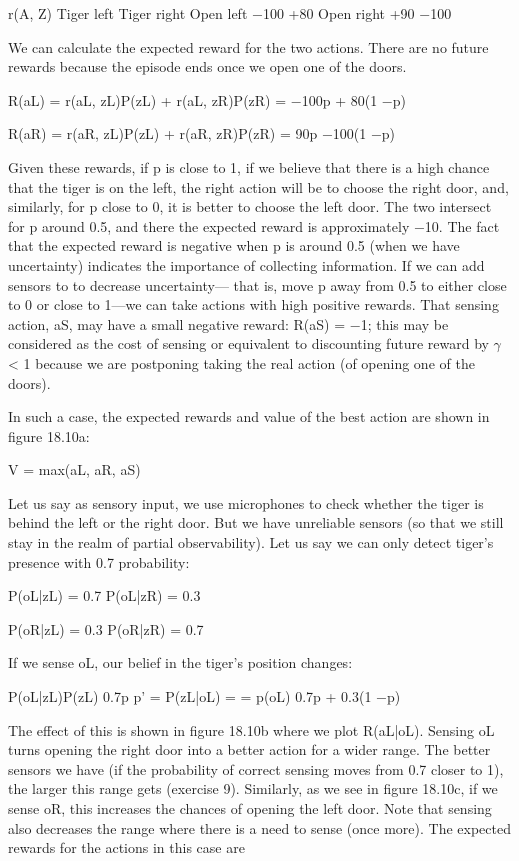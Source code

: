 r(A, Z) Tiger left Tiger right Open left $-$100 +80 Open right +90 $-$100

We can calculate the expected reward for the two actions. There are no future rewards because the episode ends once we open one of the doors.

R(aL) = r(aL, zL)P(zL) + r(aL, zR)P(zR) = $-$100p + 80(1 $-$p)

R(aR) = r(aR, zL)P(zL) + r(aR, zR)P(zR) = 90p $-$100(1 $-$p)

Given these rewards, if p is close to 1, if we believe that there is a high chance that the tiger is on the left, the right action will be to choose the right door, and, similarly, for p close to 0, it is better to choose the left door. The two intersect for p around 0.5, and there the expected reward is approximately $-$10. The fact that the expected reward is negative when p is around 0.5 (when we have uncertainty) indicates the importance of collecting information. If we can add sensors to to decrease uncertainty--- that is, move p away from 0.5 to either close to 0 or close to 1---we can take actions with high positive rewards. That sensing action, aS, may have a small negative reward: R(aS) = $-$1; this may be considered as the cost of sensing or equivalent to discounting future reward by $\gamma$ < 1 because we are postponing taking the real action (of opening one of the doors).

In such a case, the expected rewards and value of the best action are shown in figure 18.10a:

V = max(aL, aR, aS)

Let us say as sensory input, we use microphones to check whether the tiger is behind the left or the right door. But we have unreliable sensors (so that we still stay in the realm of partial observability). Let us say we can only detect tiger’s presence with 0.7 probability:

P(oL|zL) = 0.7 P(oL|zR) = 0.3

P(oR|zL) = 0.3 P(oR|zR) = 0.7

If we sense oL, our belief in the tiger’s position changes:

P(oL|zL)P(zL) 0.7p p' = P(zL|oL) = = p(oL) 0.7p + 0.3(1 $-$p)

The effect of this is shown in figure 18.10b where we plot R(aL|oL). Sensing oL turns opening the right door into a better action for a wider range. The better sensors we have (if the probability of correct sensing moves from 0.7 closer to 1), the larger this range gets (exercise 9). Similarly, as we see in figure 18.10c, if we sense oR, this increases the chances of opening the left door. Note that sensing also decreases the range where there is a need to sense (once more). The expected rewards for the actions in this case are

